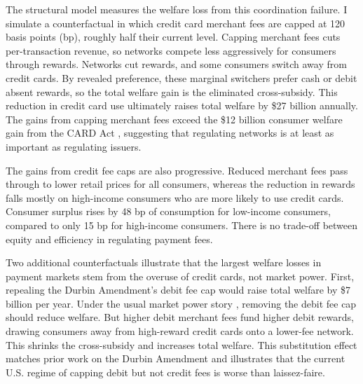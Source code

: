\documentclass[main.tex]{subfiles}
\begin{document}
The structural model measures the welfare loss from this coordination failure.
I simulate a counterfactual in which credit card merchant fees are capped at 120 basis points (bp), roughly half their current level.
Capping merchant fees cuts per-transaction revenue, so networks compete less aggressively for consumers through rewards.
Networks cut rewards, and some consumers switch away from credit cards.
By revealed preference, these marginal switchers prefer cash or debit absent rewards, so the total welfare gain is the eliminated cross-subsidy.
This reduction in credit card use ultimately raises total welfare by \$27 billion annually.
The gains from capping merchant fees exceed the \$12 billion consumer welfare gain from the CARD Act \parencite{Agarwal.etal2015},
suggesting that regulating networks is at least as important as regulating issuers.

The gains from credit fee caps are also progressive. 
Reduced merchant fees pass through to lower retail prices for all consumers, whereas the reduction in rewards falls mostly on high-income consumers who are more likely to use credit cards.
Consumer surplus rises by 48 bp of consumption for low-income consumers, compared to only 15 bp for high-income consumers.
There is no trade-off between equity and efficiency in regulating payment fees.

Two additional counterfactuals illustrate that the largest welfare losses in payment markets stem from the overuse of credit cards, not market power.
First, repealing the Durbin Amendment's debit fee cap would raise total welfare by \$7 billion per year.
Under the usual market power story \parencite{Cuesta.Sepulveda2021}, removing the debit fee cap should reduce welfare.
But higher debit merchant fees fund higher debit rewards, drawing consumers away from high-reward credit cards onto a lower-fee network.
This shrinks the cross-subsidy and increases total welfare.
This substitution effect matches prior work on the Durbin Amendment \parencite{Mukharlyamov.Sarin2025} and illustrates that the current U.S. regime of capping debit but not credit fees is worse than laissez-faire.
\end{document}
